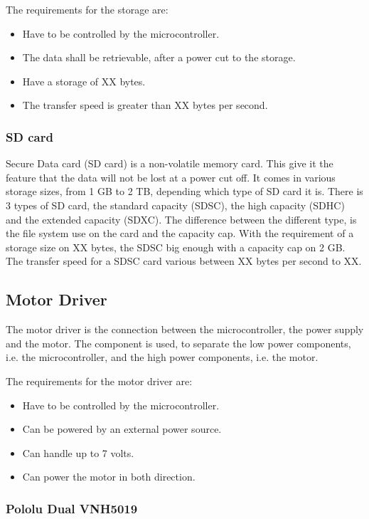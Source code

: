 The requirements for the storage are:
\begin{itemize}
\item Have to be controlled by the microcontroller.
\item The data shall be retrievable, after a power cut to the storage. 
\item Have a storage of XX bytes. 
\item The transfer speed is greater than XX bytes per second. 
\end{itemize}

\subsubsection{SD card}
Secure Data card (SD card) is a non-volatile memory card. This give it the feature that the data will not be lost at a power cut off. It comes in various storage sizes, from 1 GB to 2 TB, depending which type of SD card it is. There is 3 types of SD card, the standard capacity (SDSC), the high capacity (SDHC) and the extended capacity (SDXC). The  difference between the different type, is the file system use on the card and the capacity cap. With the requirement of a storage size on XX bytes, the SDSC big enough with a capacity cap on 2 GB. The transfer speed for a SDSC card various between XX bytes per second to XX.

\subsection{Motor Driver}
The motor driver is the connection between the microcontroller, the power supply and the motor. The component is used, to separate the low power components, i.e. the microcontroller, and the high power components, i.e. the motor.

The requirements for the motor driver are:
\begin{itemize}
\item Have to be controlled by the microcontroller.
\item Can be powered by an external power source.
\item Can handle up to 7 volts. 
\item Can power the motor in both direction.
\end{itemize}

\subsubsection{Pololu Dual VNH5019}

